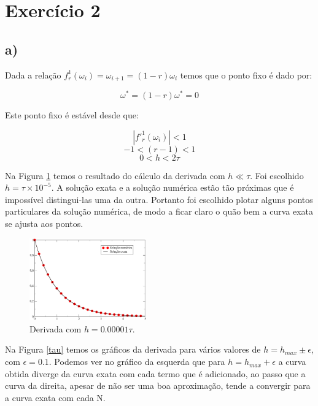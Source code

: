 \documentclass[a4wide]{report}
\begin{document}
\section*{Exercício 2}

\subsection*{a)}
Dada a relação $f^{1}_{r}(\omega_i) = \omega_{i+1} = (1-r)\omega_i$ temos que o ponto fixo é dado por:

\begin{equation}
\omega^* = (1-r)\omega^* = 0
\end{equation}

Este ponto fixo é estável desde que:

\begin{equation*}
|f'^1_r(\omega_i) | < 1
\end{equation*}
\begin{equation*}
-1 < (r-1) < 1   
\end{equation*}
\begin{equation}
0 < h < 2\tau   
\end{equation}

Na Figura \ref{taubom} temos o resultado do cálculo da derivada com $h \ll \tau$. Foi escolhido $h =\tau \times 10^{-5} $. A solução exata e a solução numérica estão tão próximas que é impossível distingui-las uma da outra. Portanto foi escolhido plotar alguns pontos particulares da solução numérica, de modo a ficar claro o quão bem a curva exata se ajusta aos pontos.

\begin{figure}[!htb]
\centering
\includegraphics[width=0.447\textwidth]{taubom.pdf}
\caption{ Derivada com $h = 0.00001 \tau $.  }
\label{taubom}
\end{figure}

Na Figura \ref{tau} temos os gráficos da derivada para vários valores de $h = h_{max} \pm \epsilon$, com $\epsilon = 0.1$. Podemos ver no gráfico da esquerda que para $h = h_{max} + \epsilon$ a curva obtida diverge da curva exata com cada termo que é adicionado, ao passo que a curva da direita, apesar de não ser uma boa aproximação, tende a convergir para a curva exata com cada N.
\end{document}
